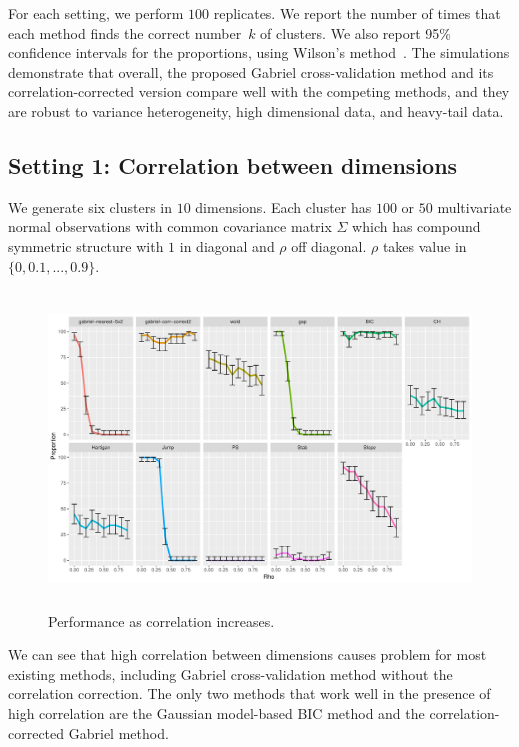 \documentclass[12pt]{article}
\begin{document}
For each setting, we perform $100$ replicates. We report the number of times
that each method finds the correct number~$k$ of clusters. We also report 95\%
confidence intervals for the proportions, using Wilson's
method~\citep{wilson1927probable}.  The simulations demonstrate that overall,
the proposed Gabriel cross-validation method and its correlation-corrected
version compare well with the competing methods, and they are robust to
variance heterogeneity, high dimensional data, and heavy-tail data.


\subsection{Setting 1: Correlation between dimensions}

We generate six clusters in $10$ dimensions.  Each cluster has $100$ or $50$
multivariate normal observations with common covariance matrix $\Sigma$ which
has compound symmetric structure with $1$ in diagonal and $\rho$ off diagonal.
$\rho$ takes value in $\{0,0.1,...,0.9\}$.
	
\begin{figure}[H]
\centering
\includegraphics[width=5.5in, height=3.3in]{main_code/demo/bench/setting1/Facet.pdf}
\caption{Performance as correlation increases.}
\label{fig:setting1}
\end{figure}
	
We can see that high correlation between dimensions causes problem for most
existing methods, including Gabriel cross-validation method without the
correlation correction.  The only two methods that work well in the presence
of high correlation are the Gaussian model-based BIC method
\citep{fraley2002model} and the correlation-corrected Gabriel method. 
\end{document}
